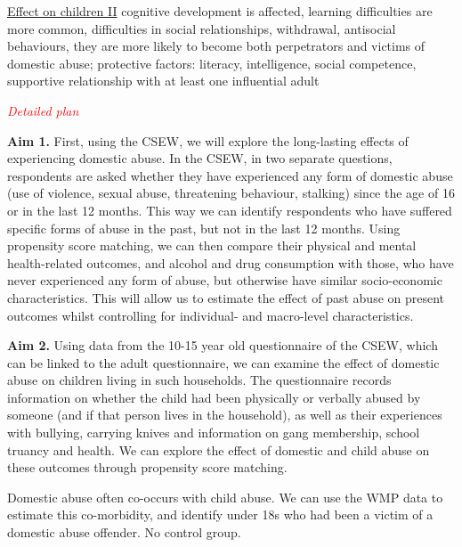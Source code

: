 \documentclass[11pt, a4paper]{article}
\begin{document}
\href{https://www.psychologytoday.com/gb/blog/progress-notes/201902/alarming-effects-childrens-exposure-domestic-violence}{Effect on children II} cognitive development is affected, learning difficulties are more common, difficulties in social relationships, withdrawal, antisocial behaviours, they are more likely to become both perpetrators and victims of domestic abuse; protective factors: literacy, intelligence, social competence, supportive relationship with at least one influential adult 


\textcolor{red}{\textit{Detailed plan}}

\textbf{Aim 1.} First, using the CSEW, we will explore the long-lasting effects of experiencing domestic abuse. In the CSEW, in two separate questions, respondents are asked whether they have experienced any form of domestic abuse (use of violence, sexual abuse, threatening behaviour, stalking) since the age of 16 or in the last 12 months. This way we can identify respondents who have suffered specific forms of abuse in the past, but not in the last 12 months. Using propensity score matching, we can then compare their physical and mental health-related outcomes, and alcohol and drug consumption with those, who have never experienced any form of abuse, but otherwise have similar socio-economic characteristics. This will allow us to estimate the effect of past abuse on present outcomes whilst controlling for individual- and macro-level characteristics.  

\textbf{Aim 2.} Using data from the 10-15 year old questionnaire of the CSEW, which can be linked to the adult questionnaire, we can examine the effect of domestic abuse on children living in such households. The questionnaire records information on whether the child had been physically or verbally abused by someone (and if that person lives in the household), as well as their experiences with bullying, carrying knives and information on gang membership, school truancy and health. We can explore the effect of domestic and child abuse on these outcomes through propensity score matching.

Domestic abuse often co-occurs with child abuse. We can use the WMP data to estimate this co-morbidity, and identify under 18s who had been a victim of a domestic abuse offender. No control group. 



\end{document}
